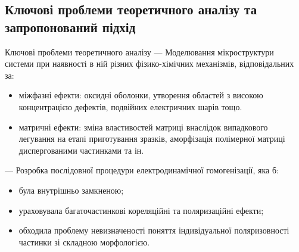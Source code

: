 \documentclass[10pt]{beamer}
\begin{document}
\subsection{Ключові проблеми теоретичного аналізу та запропонований підхід}
\begin{frame}{Ключові проблеми теоретичного аналізу}
--- Моделювання мікроструктури системи при наявності в ній різних фізико-хімічних механізмів, відповідальних за:
\begin{itemize}\footnotesize
    \item міжфазні ефекти: оксидні оболонки, утворення областей з високою концентрацією дефектів, подвійних електричних шарів тощо.
    \item матричні ефекти: зміна властивостей матриці внаслідок випадкового легування на етапі приготування зразків, аморфізація полімерної матриці диспергованими частинками та ін.
\end{itemize}

--- Розробка послідовної процедури електродинамічної гомогенізації, яка б:
  
\begin{itemize}\footnotesize
    \item була внутрішньо замкненою;
    \item ураховувала  багаточастинкові кореляційні та поляризаційні ефекти;
    \item обходила проблему невизначеності поняття індивідуальної поляризовності частинки зі складною морфологією.
\end{itemize}

\end{frame}

    
\end{document}
